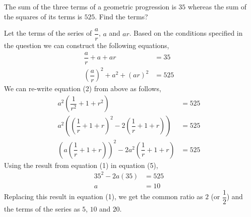 

\question[3] The sum of the three terms of a geometric progression is $35$ whereas the sum of the squares of its terms is $525$. Find the terms?


\ifprintanswers
\fi 

\begin{solution}[\halfpage]
  Let the terms of the series of $\dfrac{a}{r}$, $a$ and $ar$. Based on the conditions specified in the question we can construct the following equations,
  \begin{align}
    \dfrac{a}{r} + a + ar           &= 35 \\
    (\dfrac{a}{r})^2 + a^2 + (ar)^2 &= 525
  \end{align}
  We can re-write equation (2) from above as follows,
  \begin{align}
    a^2(\dfrac{1}{r^2} + 1 + r^2)                            &= 525 \\
    a^2((\dfrac{1}{r} + 1 + r)^2 - 2(\dfrac{1}{r} + 1 + r))  &= 525 \\
    (a(\dfrac{1}{r} + 1 + r))^2 - 2a^2(\dfrac{1}{r} + 1 + r) &= 525
  \end{align}  
  Using the result from equation (1) in equation (5),
  \begin{align}
    35^2 - 2a(35) &= 525 \\
    a             &= 10
  \end{align}
  Replacing this result in equation (1), we get the common ratio as $2$ (or $\dfrac{1}{2}$) and the terms of the series as $5$, $10$ and $20$.
  
\end{solution}

